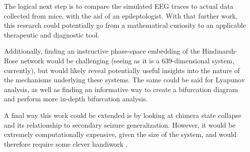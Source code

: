 The logical next step is to compare the simulated EEG traces to actual data collected from mice, with the aid of an epileptologist.
With that further work, this research could potentially go from a mathematical curiosity to an applicable therapeutic and diagnostic tool.

Additionally, finding an instructive phase-space embedding of the Hindmarsh-Rose network would be challenging (seeing as it is a 639-dimensional system, currently),
but would likely reveal potentially useful insights into the nature of the mechanisms underlying these systems.
The same could be said for Lyapunov analysis, as well as finding an informative way to create a bifurcation diagram and perform more in-depth bifurcation analysis.

A final way this work could be extended is by looking at chimera state collapse and its relationship to secondary seizure generalization.
However, it would be extremely computationally expensive, given the size of the system, and would therefore require some clever handiwork \cite{Wolfrum2011}.

